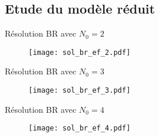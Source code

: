 \documentclass[10pt]{beamer}
\begin{document}
\subsection{Etude du modèle réduit}


\begin{comment}
Dans cette section, nous allons analyser la solution réduite du problème \eqref{eqnum1}. Pour ce faire, il faut d'abord choisir la valeur $N_{0}$ afin d'appliquer l'algorithme glouton.

Après la construction de $V_{0}^{BR}$ et $V_{1}^{BR}$ pour diverses valeurs de $N_{0}$, nous avons calculé leur conditionnement respectif. Quand $N_{0}$ est supérieur ou égale à 5, le problème devient mal conditionné et leurs conditionnements sont alors de l'ordre de $10^{16}$ d'après le graphique \eqref{fig:1}. Lorsque $N_{0}$ est égal à 2, le résultat est très insuffisant. Les valeurs convenables de $N_{0}$ sont donc 3,4,5. 
Dans la suite, nous fixons $N_{0}$ à 3 pour avoir un conditionnement pas trop élevé.

\end{comment}



\begin{frame}{Résolution BR avec $N_0 = 2$}

\begin{figure}
\begin{center}
\texttt{[image: sol\_br\_ef\_2.pdf]}
\end{center}
\end{figure}

\end{frame}


\begin{frame}{Résolution BR avec $N_0 = 3$}
\begin{figure}
\begin{center}
\texttt{[image: sol\_br\_ef\_3.pdf]}
\end{center}
\end{figure}

\end{frame}


\begin{frame}{Résolution BR avec $N_0 = 4$}
\begin{figure}
\begin{center}
\texttt{[image: sol\_br\_ef\_4.pdf]}
\end{center}
\end{figure}

\end{frame}
\end{document}
